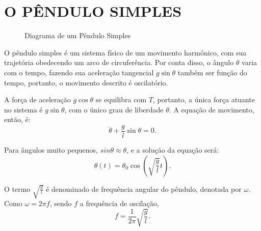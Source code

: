 \documentclass[10pt,a4paper,twocolumn]{article}
\begin{document}
\section{O PÊNDULO SIMPLES}
\begin{figure}[H]
\begin{center}
\end{center}
\caption{Diagrama de um Pêndulo Simples}
\label{fig:pendulo}
\end{figure}
\par O pêndulo simples é um sistema físico de um movimento harmônico, com sua trajetória obedecendo um arco de circuferência. Por conta disso, o ângulo $\theta$ varia com o tempo, fazendo sua aceleração tangencial $g\sin\theta$ também ser função do tempo, portanto, o movimento descrito é oscilatório.
\par A força de aceleração $g\cos\theta$ se equilibra com $T$, portanto, a única força atuante no sistema é $g\sin\theta$, com o único grau de liberdade $\theta$. A equação de movimento, então, é:
\begin{equation}
\ddot{\theta}+\frac{g}{l}\sin\theta=0.
\end{equation}
\par Para ângulos muito pequenos, $sin\theta\approx\theta$, e a solução da equação será:
\begin{equation}
\theta(t)=\theta_0\cos(\sqrt{\frac{g}{l}}t).
\end{equation}
\par O termo $\sqrt{\frac{g}{l}}$ é denominado de frequência angular do pêndulo, denotada por $\omega$. Como $\omega=2\pi f$, sendo $f$ a frequência de oscilação, 
\begin{equation}
\label{eqn:freq}
f=\frac{1}{2\pi}\sqrt{\frac{g}{l}}.
\end{equation}
\end{document}
